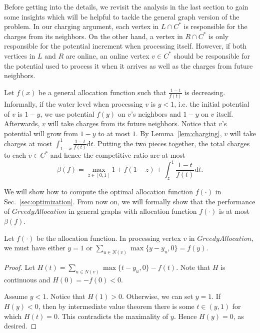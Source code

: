 \documentclass{article}
\begin{document}
Before getting into the details, we revisit the analysis in the last section to gain some insights which will be helpful to tackle the general graph version of the problem. In our charging argument, each vertex in $L\cap C^*$ is responsible for the charges from its neighbors. On the other hand, a vertex in $R\cap C^*$ is only responsible for the potential increment when processing itself. However, if both vertices in $L$ and $R$ are online, an online vertex $v\in C^*$ should be responsible for the potential used to process it when it arrives as well as the charges from future neighbors.

Let $f(x)$ be a general allocation function such that $\frac{1-t}{f(t)}$ is decreasing. Informally, if the water level when processing $v$ is $y<1$, i.e. the initial potential of $v$ is $1-y$, we use potential $f(y)$ on $v$'s neighbors and $1-y$ on $v$ itself. Afterwards, $v$ will take charges from its future neighbors. Notice that $v$'s potential will grow from $1-y$ to at most $1$. By Lemma~\ref{lem:charging}, $v$ will take charges at most $\int_{1-x}^1 \frac{1-t}{f(t)} \mathrm{d}t$. Putting the two pieces together, the total charges to each $v\in C^*$ and hence the competitive ratio are at most 
\[
\beta(f) = \max_{z\in [0,1]} 1 + f(1-z) + \int_{z}^1 \frac{1-t}{f(t)}\mathrm{d}t.
\]

We will show how to compute the optimal allocation function $f(\cdot)$ in Sec.~\ref{sec:optimization}. From now on, we will formally show that the performance of $GreedyAllocation$ in general graphs with allocation function $f(\cdot)$ is at most $\beta(f)$.







\begin{lemma}
Let $f(\cdot)$ be the allocation function.
In processing vertex $v$ in $GreedyAllocation$, we must have either $y=1$ or $\sum_{u\in N(v)} \max\{y-y_u,0\}= f(y)$.
\end{lemma}
\begin{proof}
Let $H(t)=\sum_{u\in N(v)}\max\{t-y_{u},0\}- f(t)$. Note that $H$ is continuous and $H(0)=-f(0)<0$.

Assume $y< 1$. Notice that $H(1)>0$. Otherwise, we can set $y=1$. If $H(y) <0$, then by intermediate value theorem there is some $t\in (y,1)$ for which $H(t)=0$. This contradicts the maximality of $y$. Hence $H(y)=0$, as desired.
\end{proof}
\end{document}
